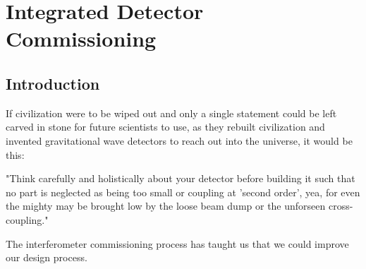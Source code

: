 \chapter[Integrated Detector Commissioning]{Integrated Detector Commissioning}
\label{IDC}




%
%
%


\section{Introduction}
\label{s:IDC:Intro}
If civilization were to be wiped out and only a single statement could be left
carved in stone for future scientists to use, as they rebuilt civilization and
invented gravitational wave detectors to reach out into the universe,
it would be this:

"Think carefully and holistically about your detector before building it
such that no part is neglected as being too small or  coupling at 'second order',
yea, for even the mighty may be brought low by the loose beam dump or the
unforseen cross-coupling."

The interferometer commissioning process has taught us that we could improve
our design process.


